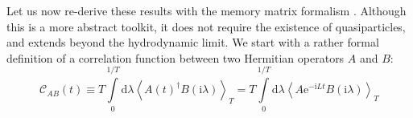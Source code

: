 \documentclass[10pt, oneside]{book}
\begin{document}
\begin{doublespace}
Let us now re-derive these results with the memory matrix formalism \cite{forster1995}.   Although this is a more abstract toolkit, it does not require the existence of quasiparticles, and extends beyond the hydrodynamic limit.   
%
%
%
%
%
We start with a rather formal definition of a correlation function between two Hermitian operators $A$ and $B$: 
\begin{equation}
\mathcal{C}_{AB}(t) \equiv T\int\limits_0^{1/T} \mathrm{d}\lambda \left\langle A(t)^\dagger B(\mathrm{i}\lambda)\right\rangle_T = T\int\limits_0^{1/T} \mathrm{d}\lambda \left\langle A \mathrm{e}^{-\mathrm{i}Lt} B(\mathrm{i}\lambda)\right\rangle_T
\end{equation}

\end{doublespace}
\end{document}

